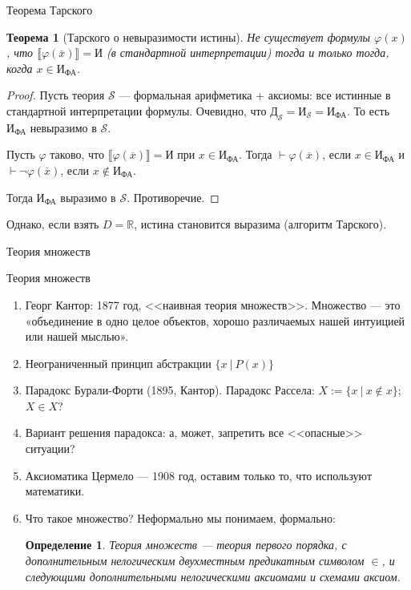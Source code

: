 \documentclass[aspectratio=169]{beamer}
\newtheorem{thm}{Теорема}[section]
\newtheorem{dfn}{Определение}[section]
\begin{document}
\begin{frame}{Теорема Тарского}
\begin{thm}[Тарского о невыразимости истины]
Не существует формулы $\varphi(x)$, что $\llbracket \varphi(\overline{x}) \rrbracket = \text{И}$ (в стандартной интерпретации) тогда и только
тогда, когда $x \in \text{И}_\text{ФА}$. \end{thm}
\begin{proof}
Пусть теория $\mathcal{S}$ --- формальная арифметика + аксиомы: все истинные в стандартной интерпретации формулы.
Очевидно, что $\text{Д}_\mathcal{S} = \text{И}_\mathcal{S} = \text{И}_\text{ФА}$. 
То есть $\text{И}_\text{ФА}$ невыразимо в $\mathcal{S}$.

Пусть $\varphi$ таково, что $\llbracket\varphi(\overline{x})\rrbracket = \text{И}$ при $x \in \text{И}_\text{ФА}$.
Тогда $\vdash\varphi(\overline{x})$, если $x \in \text{И}_\text{ФА}$ и $\vdash\neg\varphi(\overline{x})$, если $x \notin\text{И}_\text{ФА}$.

Тогда $\text{И}_\text{ФА}$ выразимо в $\mathcal{S}$. Противоречие.
\end{proof}

\pause
Однако, если взять $D = \mathbb{R}$, истина становится выразима (алгоритм Тарского).
\end{frame}

\begin{frame}{}
\LARGE\begin{center}Теория множеств\end{center}
\end{frame}

\begin{frame}{Теория множеств}
\begin{enumerate}
\item Георг Кантор: 1877 год, <<наивная теория множеств>>. Множество --- это «объединение в одно
целое объектов, хорошо различаемых нашей интуицией или нашей мыслью».\pause
\item Неограниченный принцип абстракции $\{ x\ |\ P(x)\}$ \pause
\item Парадокс Бурали-Форти (1895, Кантор). Парадокс Рассела: $X := \{ x\ |\ x \notin x\}$; $X\in X$?\pause
\item Вариант решения парадокса: а, может, запретить все <<опасные>> ситуации? \pause
\item Аксиоматика Цермело --- 1908 год, оставим только то, что используют математики. \pause
\item Что такое множество? Неформально мы понимаем, формально:\pause

\begin{dfn} Теория множеств --- теория первого порядка,
с дополнительным нелогическим двухместным предикатным символом $\in$, и следующими 
дополнительными нелогическими аксиомами и схемами аксиом.
\end{dfn}
\end{enumerate}
\end{frame}
\end{document}

